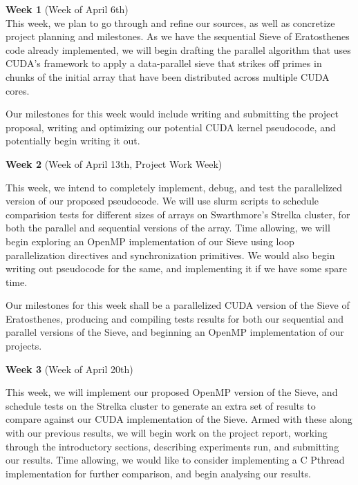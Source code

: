 \documentclass[11pt]{article}
\newenvironment{my_enumerate}{
  \begin{enumerate}
    \setlength{\itemsep}{1pt}
      \setlength{\parskip}{0pt}
\setlength{\parsep}{0pt}}{\end{enumerate}
}
\begin{document}
\begin{my_enumerate}
    \item \textbf{Week 1} (Week of April 6th) \\
     This week, we plan to go through and refine our sources, as well as concretize 
     project planning and milestones. As we have the sequential Sieve of Eratosthenes 
     code already implemented, we will begin drafting the parallel algorithm that uses 
     CUDA's framework to apply a data-parallel sieve that strikes off primes in 
     chunks of the initial array that have been distributed across multiple CUDA cores. 
     
     Our milestones for this week would include writing and submitting the project
     proposal, writing and optimizing our potential CUDA kernel pseudocode, and 
     potentially begin writing it out.
     \vspace{0.1in}
     
    \item \textbf{Week 2} (Week of April 13th, Project Work Week)
    
     This week, we intend to completely implement, debug, and test the parallelized 
     version of our proposed pseudocode. We will use slurm scripts to schedule comparision 
     tests for different sizes of arrays on Swarthmore's Strelka cluster, for both 
     the parallel and sequential versions of the array. Time allowing, we will begin 
     exploring an OpenMP implementation of our Sieve using loop parallelization 
     directives and synchronization primitives. We would also begin writing out 
     pseudocode for the same, and implementing it if we have some spare time.
     
     Our milestones for this week shall be a parallelized CUDA version of 
     the Sieve of Eratosthenes, producing and compiling tests results for 
     both our sequential and parallel versions of the Sieve, and beginning an OpenMP 
     implementation of our projects.
     \vspace{0.1in}
     
    \item \textbf{Week 3} (Week of April 20th)
    
     This week, we will implement our proposed OpenMP version of the Sieve, and
     schedule tests on the Strelka cluster to generate an extra set of results to 
     compare against our CUDA implementation of the Sieve. Armed with these along
     with our previous results, we will begin work on the project report, working 
     through the introductory sections, describing experiments run, and submitting
     our results. Time allowing, we would like to consider implementing a C Pthread 
     implementation for further comparison, and begin analysing our results.
     

\end{my_enumerate}
\end{document}
